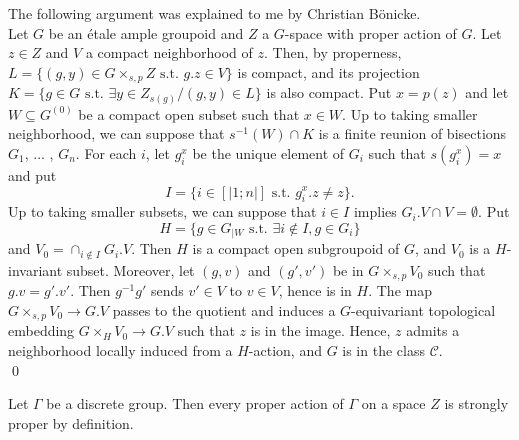 \begin{dem} The following argument was explained to me by Christian Bönicke.\\ 
Let $G$ be an étale ample groupoid and $Z$ a $G$-space with proper action of $G$. Let $z\in Z$ and $V$ a compact neighborhood of $z$. Then, by properness, $L = \{(g,y)\in G\times_{s,p} Z \text{ s.t. } g.z\in V \}$ is compact, and its projection $K = \{g\in G \text{ s.t. } \exists  y\in Z_{s(g)} / (g,y)\in L\}$ is also compact. Put $x=p(z)$ and let $W\subseteq G^{(0)}$ be a compact open subset such that $x\in W$. Up to taking smaller neighborhood, we can suppose that $s^{-1}(W)\cap K$ is a finite reunion of bisections $G_1$, ... , $G_n$. For each $i$, let $g_i^x$ be the unique element of $G_i$ such that $s(g_i^x)=x$ and put
\[I = \{i\in [|1;n|] \text{ s.t. } g_i^x . z \neq z\}.\]
Up to taking smaller subsets, we can suppose that $i\in I$ implies $G_i. V \cap V = \emptyset$. Put 
\[H = \{g\in G_{|W} \text{ s.t. } \exists i\notin I, g\in G_i \}\]
and $V_0 = \cap_{i\notin I} G_i.V$. Then $H$ is a compact open subgroupoid of $G$, and $V_0$ is a $H$-invariant subset. Moreover, let $(g,v)$ and $(g',v')$ be in $G\times_{s,p} V_0$ such that $g.v=g'.v'$. Then $g^{-1}g'$ sends $v'\in V$ to $v\in V$, hence is in $H$. The map $G\times_{s,p} V_0\rightarrow G.V$ passes to the quotient and induces a $G$-equivariant topological embedding $G\times_H V_0 \rightarrow G.V$ such that $z$ is in the image. Hence, $z$ admits a neighborhood locally induced from a $H$-action, and $G$ is in the class $\mathcal C$.\\   
\qed
\end{dem}

\begin{rk}
Let $\Gamma$ be a discrete group. Then every proper action of $\Gamma$ on a space $Z$ is strongly proper by definition.
\end{rk}









